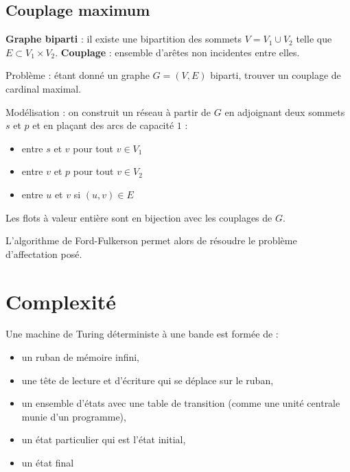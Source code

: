 \documentclass[a4paper,10pt,twocolumn]{article}
\begin{document}
	\subsection{Couplage maximum}

		\begin{defn}
		\textbf{Graphe biparti} : il existe une bipartition des sommets $V = V_1 \cup V_2$ telle que $E \subset V_1 \times V_2$.
		\textbf{Couplage} : ensemble d’arêtes non incidentes entre elles.
		\end{defn}

		Problème : étant donné un graphe $G = (V,E)$ biparti, trouver un couplage de cardinal maximal.

		Modélisation : on construit un réseau à partir de $G$ en adjoignant deux sommets $s$ et $p$ et en plaçant des arcs de capacité $1$ :
		\begin{itemize}
			\item entre $s$ et $v$ pour tout $v \in V_1$
			\item entre $v$ et $p$ pour tout $v \in V_2$
			\item entre $u$ et $v$ si $(u,v) \in E$
		\end{itemize}

		\begin{pop}
		Les flots à valeur entière sont en bijection avec les couplages de $G$.
		\end{pop}

		L'algorithme de Ford-Fulkerson permet alors de résoudre le problème d'affectation posé.


\section{Complexité}

	\begin{defn}
	Une machine de Turing déterministe à une bande est formée de :
	\begin{itemize}
	\item un ruban de mémoire infini,
	\item une tête de lecture et d'écriture qui se déplace sur le ruban,
	\item un ensemble d'états avec une table de transition (comme une unité centrale munie d'un programme),
	\item un état particulier qui est l'état initial,
	\item un état final
	\end{itemize}
	\end{defn}
\end{document}
